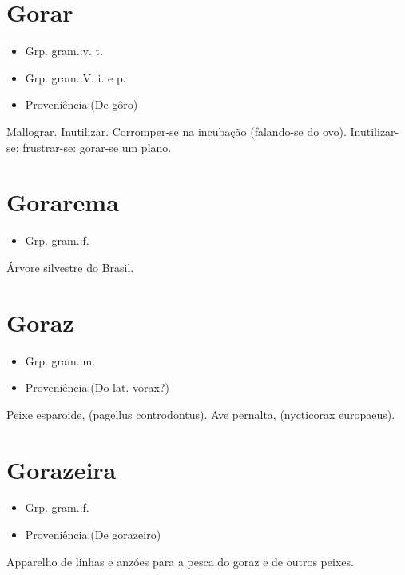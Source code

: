 \section{Gorar}
\begin{itemize}
\item {Grp. gram.:v. t.}
\end{itemize}
\begin{itemize}
\item {Grp. gram.:V. i.  e  p.}
\end{itemize}
\begin{itemize}
\item {Proveniência:(De \textunderscore gôro\textunderscore )}
\end{itemize}
Mallograr.
Inutilizar.
Corromper-se na incubação (falando-se do ovo).
Inutilizar-se; frustrar-se: \textunderscore gorar-se um plano\textunderscore .
\section{Gorarema}
\begin{itemize}
\item {Grp. gram.:f.}
\end{itemize}
Árvore silvestre do Brasil.
\section{Goraz}
\begin{itemize}
\item {Grp. gram.:m.}
\end{itemize}
\begin{itemize}
\item {Proveniência:(Do lat. \textunderscore vorax\textunderscore ?)}
\end{itemize}
Peixe esparoide, (\textunderscore pagellus controdontus\textunderscore ).
Ave pernalta, (\textunderscore nycticorax europaeus\textunderscore ).
\section{Gorazeira}
\begin{itemize}
\item {Grp. gram.:f.}
\end{itemize}
\begin{itemize}
\item {Proveniência:(De \textunderscore gorazeiro\textunderscore )}
\end{itemize}
Apparelho de linhas e anzóes para a pesca do goraz e de outros peixes.
